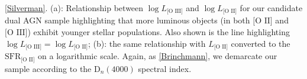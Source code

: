 \label{Silverman} \ref{Silverman}. (a): Relationship between $\log{L_{\text{[O III]}}}$ and $\log{L_{\text{[O II]}}}$ for our candidate dual AGN sample highlighting that more luminous objects (in both $\text{[O II]}$ and $\text{[O III]}$) exhibit younger stellar populations. Also shown is the line highlighting $\log{L_{\text{[O III]}}}=\log{L_{\text{[O II]}}}$; (b): the same relationship with ${L_{\text{[O II]}}}$ converted to the $\text{SFR}_{\text{[O II]}}$ on a logarithmic scale. Again, as \ref{Brinchmann}, we demarcate our sample according to the $\text{D}_{n}(4000)$ spectral index. 
  
  